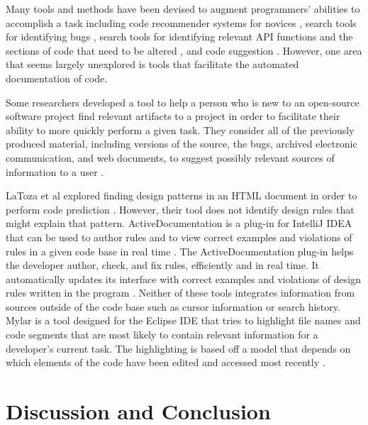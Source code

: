 \documentclass[12pt]{article}
\begin{document}
Many tools and methods have been devised to augment programmers' abilities to accomplish a task including code recommender systems for novices \cite{HartmannEtAl2010}, search tools for identifying bugs \cite{HovemeyerPugh2004}, search tools for identifying relevant API functions and the sections of code that need to be altered \cite{RongEtAl2016}, and code suggestion \cite{RaychevEtAl2014}. However, one area that seems largely unexplored is tools that facilitate the automated documentation of code.

Some researchers developed a tool to help a person who is new to an open-source software project find relevant artifacts to a project in order to facilitate their ability to more quickly perform a given task. They consider all of the previously produced material, including versions of the source, the bugs, archived electronic communication, and web documents, to suggest possibly relevant sources of information to a user \cite{CubranicMurphy2003}.

LaToza et al explored finding design patterns in an HTML document in order to perform code prediction \cite{LaTozaEtAl2019}. However, their tool does not identify design rules that might explain that pattern. 
ActiveDocumentation is a plug-in for IntelliJ IDEA that can be used to author rules and to view correct examples and violations of rules in a given code base in real time \cite{MehrpurEtAl2019}. The ActiveDocumentation plug-in helps the developer author, check, and fix rules, efficiently and in real time. It automatically updates its interface with correct examples and violations of design rules written in the program \cite{MehrpurEtAl2019}. Neither of these tools integrates information from sources outside of the code base such as cursor information or search history. Mylar is a tool designed for the Eclipse IDE that tries to highlight file names and code segments that are most likely to contain relevant information for a developer's current task. The highlighting is based off a model that depends on which elements of the code have been edited and accessed most recently \cite{KerstenMurphy2005}.




\clearpage


\section{Discussion and Conclusion}\label{disc}
\end{document}
